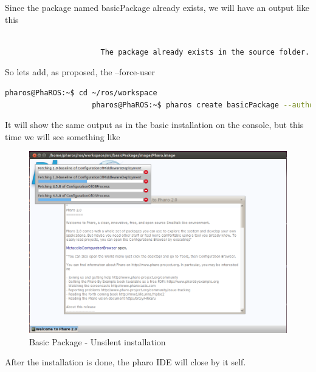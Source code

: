\documentclass[a4paper,10pt,twoside]{book}
\begin{document}
				 Since the package named basicPackage already exists, we will have an output like this
				 
				 \begin{lstlisting}[language=bash,title={ Unsilent package creation -Error }]
				 
					  The package already exists in the source folder. Add --force-new for deleting the existant package

				\end{lstlisting} 
				
				So lets add, as proposed, the --force-user
				
				\begin{lstlisting}[language=bash,title={ Unsilent package creation }]
					pharos@PhaROS:~$ cd ~/ros/workspace
					pharos@PhaROS:~$ pharos create basicPackage --author="MyUserName" --author-email="user@mail.com" --maintainer="OtherUserName" --silent=false --force-new
				\end{lstlisting} 
				
				
				It will show the same output as in the basic installation on the console, but this time we will see something like
				
				\begin{figure}[!htbp]
			  		\centering
				    		\includegraphics[width=1\textwidth]{PackageCreation.png}
						
						\caption{Basic Package - Unsilent installation}
					\centering
				\end{figure}
				
				After the installation is done, the pharo IDE will close by it self. 
				
\end{document}

